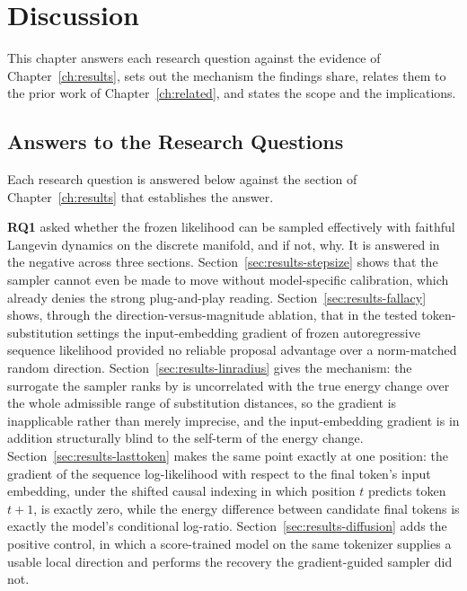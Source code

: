 \chapter{Discussion}
\label{ch:discussion}

This chapter answers each research question against the evidence of Chapter~\ref{ch:results}, sets out the mechanism the findings share, relates them to the prior work of Chapter~\ref{ch:related}, and states the scope and the implications.

\section{Answers to the Research Questions}
\label{sec:disc-rqs}

Each research question is answered below against the section of Chapter~\ref{ch:results} that establishes the answer.

\textbf{RQ1} asked whether the frozen likelihood can be sampled effectively with faithful Langevin dynamics on the discrete manifold, and if not, why. It is answered in the negative across three sections. Section~\ref{sec:results-stepsize} shows that the sampler cannot even be made to move without model-specific calibration, which already denies the strong plug-and-play reading. Section~\ref{sec:results-fallacy} shows, through the direction-versus-magnitude ablation, that in the tested token-substitution settings the input-embedding gradient of frozen autoregressive sequence likelihood provided no reliable proposal advantage over a norm-matched random direction. Section~\ref{sec:results-linradius} gives the mechanism: the surrogate the sampler ranks by is uncorrelated with the true energy change over the whole admissible range of substitution distances, so the gradient is inapplicable rather than merely imprecise, and the input-embedding gradient is in addition structurally blind to the self-term of the energy change. Section~\ref{sec:results-lasttoken} makes the same point exactly at one position: the gradient of the sequence log-likelihood with respect to the final token's input embedding, under the shifted causal indexing in which position $t$ predicts token $t+1$, is exactly zero, while the energy difference between candidate final tokens is exactly the model's conditional log-ratio. Section~\ref{sec:results-diffusion} adds the positive control, in which a score-trained model on the same tokenizer supplies a usable local direction and performs the recovery the gradient-guided sampler did not.

